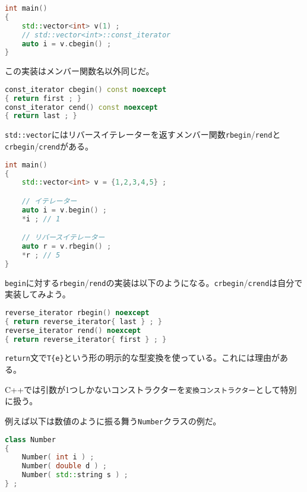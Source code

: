 \begin{lstlisting}[language={C++}]
int main()
{
    std::vector<int> v(1) ;
    // std::vector<int>::const_iterator
    auto i = v.cbegin() ;
}
\end{lstlisting}

この実装はメンバー関数名以外同じだ。

\ifTombow\enlargethispage{3mm}\fi
\begin{lstlisting}[language={C++}]
const_iterator cbegin() const noexcept
{ return first ; }
const_iterator cend() const noexcept
{ return last ; }
\end{lstlisting}

\texttt{std::vector}にはリバースイテレーターを返すメンバー関数\texttt{rbegin}/\texttt{rend}と\texttt{crbegin}/\texttt{crend}がある。

\begin{lstlisting}[language={C++}]
int main()
{
    std::vector<int> v = {1,2,3,4,5} ;

    // イテレーター
    auto i = v.begin() ;
    *i ; // 1

    // リバースイテレーター
    auto r = v.rbegin() ;
    *r ; // 5
}
\end{lstlisting}

\texttt{begin}に対する\texttt{rbegin}/\texttt{rend}の実装は以下のようになる。\texttt{crbegin}/\texttt{crend}は自分で実装してみよう。

\begin{lstlisting}[language={C++}]
reverse_iterator rbegin() noexcept
{ return reverse_iterator{ last } ; }
reverse_iterator rend() noexcept
{ return reverse_iterator{ first } ; }
\end{lstlisting}

\texttt{return}文で\texttt{T\{e\}}という形の明示的な型変換を使っている。これには理由がある。

C++では引数が1つしかないコンストラクターを\texttt{変換コンストラクター}として特別に扱う。

例えば以下は数値のように振る舞う\texttt{Number}クラスの例だ。

\begin{lstlisting}[language={C++}]
class Number
{
    Number( int i ) ;
    Number( double d ) ;
    Number( std::string s ) ;
} ;
\end{lstlisting}

